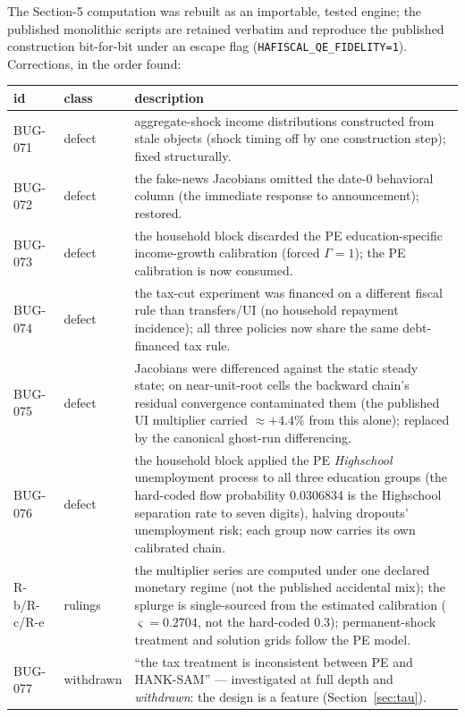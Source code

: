 \documentclass[11pt]{article}
\begin{document}
The Section-5 computation was rebuilt as an importable, tested engine;
the published monolithic scripts are retained verbatim and reproduce the
published construction bit-for-bit under an escape flag
(\texttt{HAFISCAL\_QE\_FIDELITY=1}). Corrections, in the order found:

\begin{center}\small
\begin{tabular}{@{}llp{8.6cm}@{}}
\toprule
id & class & description \\
\midrule
BUG-071 & defect & aggregate-shock income distributions constructed from stale objects (shock timing off by one construction step); fixed structurally. \\
BUG-072 & defect & the fake-news Jacobians omitted the date-0 behavioral column (the immediate response to announcement); restored. \\
BUG-073 & defect & the household block discarded the PE education-specific income-growth calibration (forced $\Gamma=1$); the PE calibration is now consumed. \\
BUG-074 & defect & the tax-cut experiment was financed on a different fiscal rule than transfers/UI (no household repayment incidence); all three policies now share the same debt-financed tax rule. \\
BUG-075 & defect & Jacobians were differenced against the static steady state; on near-unit-root cells the backward chain's residual convergence contaminated them (the published UI multiplier carried $\approx+4.4\%$ from this alone); replaced by the canonical ghost-run differencing. \\
BUG-076 & defect & the household block applied the PE \emph{Highschool} unemployment process to all three education groups (the hard-coded flow probability 0.0306834 is the Highschool separation rate to seven digits), halving dropouts' unemployment risk; each group now carries its own calibrated chain. \\
\midrule
R-b/R-c/R-e & rulings & the multiplier series are computed under one declared monetary regime (not the published accidental mix); the splurge is single-sourced from the estimated calibration ($\varsigma=0.2704$, not the hard-coded 0.3); permanent-shock treatment and solution grids follow the PE model. \\
BUG-077 & withdrawn & ``the tax treatment is inconsistent between PE and HANK-SAM'' --- investigated at full depth and \emph{withdrawn}: the design is a feature (Section~\ref{sec:tau}). \\
\bottomrule
\end{tabular}
\end{center}
\end{document}
